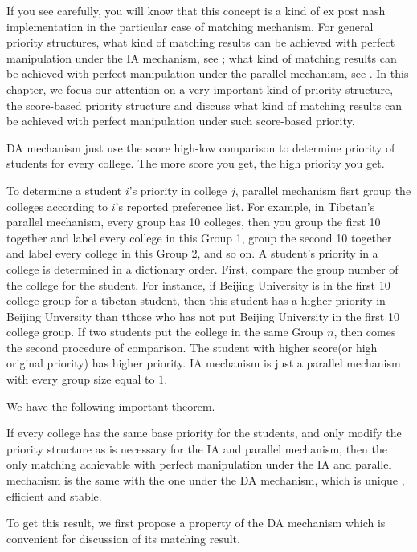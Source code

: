 If you see carefully, you will know that this concept is  a kind of ex post nash
implementation in the particular case of matching mechanism.  For
general priority structures, what
kind of matching results can be achieved with perfect manipulation
under the IA mechanism, see \parencite{Ergin2006}; what kind of
matching results can be achieved with perfect manipulation under the
parallel mechanism, see \parencite{YanChenJPE}.  In this chapter, we
focus our attention on a very important kind of priority structure,
the score-based priority structure and discuss what kind of matching
results can be achieved with perfect manipulation under such
score-based priority. 

DA mechanism just use the score high-low comparison to determine
priority of students for every college. The more score you get, the
high priority you get.

To determine a student $i$'s priority in college $j$, parallel
mechanism fisrt group the colleges according to $i$'s reported
preference list. For example, in Tibetan's parallel mechanism, every
group has 10 colleges, then you group the first 10 together and label
every college in this Group 1, group the second 10 together and label
every college in this Group 2, and so on. A student's priority in a
college is determined in a dictionary order. First, compare the group
number of the college for the student. For instance, if Beijing
University is in the first 10 college group for a tibetan student, 
then this student has a higher priority in Beijing Unversity than
tthose who has not put  Beijing University in the first 10 college
group. If two students put the college in the same Group $n$, then
comes the second procedure of comparison. The student with higher
score(or high original priority) has higher priority. IA mechanism is
just a parallel mechanism with every group size equal to $1$.


We have the following important theorem.

\begin{thm}\label{same}
If every college has the same base priority for the students, and only
modify the priority structure as is necessary for the IA and parallel
mechanism, then the only matching achievable with perfect
manipulation under the IA and parallel mechanism  is the same with the one under  the DA mechanism, which is  unique , efficient and stable. 
\end{thm}

To get this result, we first propose a property of the DA mechanism which is convenient for discussion of its matching result. 

